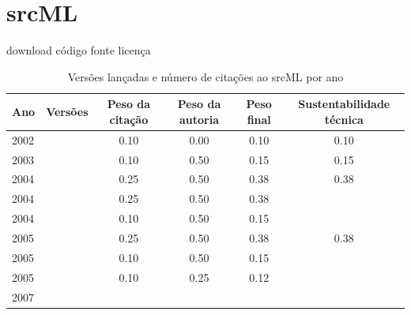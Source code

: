 \section{srcML}
\checkmark download
\checkmark código fonte
\checkmark licença


\begin{table}[H]
\caption{Versões lançadas e número de citações ao srcML por ano}
\centering
\begin{tabular}{| l | c | c | c | c | c |}
  \hline
  Ano & Versões & Peso da citação & Peso da autoria & Peso final & Sustentabilidade técnica \\
  \hline
            2002
          &
          
          &
          0.10
          &
          0.00
          &
          0.10
          &
            {\color{red} 0.10}
          \\
\hline
            2003
          &
          
          &
          0.10
          &
          0.50
          &
          0.15
          &
            {\color{red} 0.15}
          \\
\hline
            2004
          &
          
          &
          0.25
          &
          0.50
          &
          0.38
          &
            {\color{red} 0.38}
          \\
            2004
          &
          
          &
          0.25
          &
          0.50
          &
          0.38
          &
          \\
            2004
          &
          
          &
          0.10
          &
          0.50
          &
          0.15
          &
          \\
\hline
            2005
          &
          
          &
          0.25
          &
          0.50
          &
          0.38
          &
            {\color{red} 0.38}
          \\
            2005
          &
          
          &
          0.10
          &
          0.50
          &
          0.15
          &
          \\
            2005
          &
          
          &
          0.10
          &
          0.25
          &
          0.12
          &
          \\
\hline
            2007
          &
          

\end{tabular}
\end{table}
